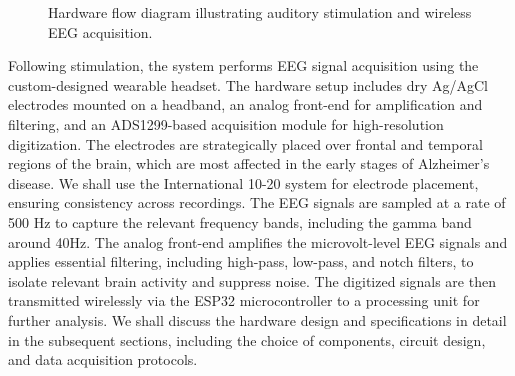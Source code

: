 \documentclass[openany]{book}
\begin{document}
\begin{figure}[htpb]
    \centering
    \caption{Hardware flow diagram illustrating auditory stimulation and wireless EEG acquisition.}
    \label{fig:eeg_hardware}
\end{figure}

Following stimulation, the system performs EEG signal acquisition using the custom-designed wearable headset. The hardware setup includes dry Ag/AgCl electrodes mounted on a headband, an analog front-end for amplification and filtering, and an ADS1299-based acquisition module for high-resolution digitization. The electrodes are strategically placed over frontal and temporal regions of the brain, which are most affected in the early stages of Alzheimer's disease. We shall use the International 10-20 system for electrode placement, ensuring consistency across recordings. The EEG signals are sampled at a rate of 500 Hz to capture the relevant frequency bands, including the gamma band around 40Hz. The analog front-end amplifies the microvolt-level EEG signals and applies essential filtering, including high-pass, low-pass, and notch filters, to isolate relevant brain activity and suppress noise. The digitized signals are then transmitted wirelessly via the ESP32 microcontroller to a processing unit for further analysis. We shall discuss the hardware design and specifications in detail in the subsequent sections, including the choice of components, circuit design, and data acquisition protocols.  \\
\end{document}
